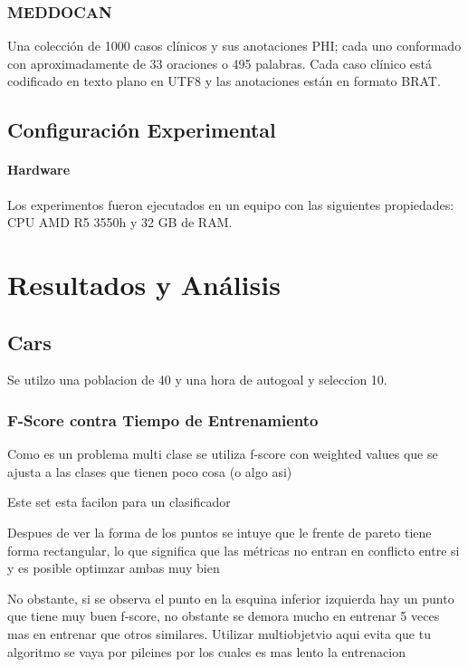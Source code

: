 \subsubsection{MEDDOCAN}

Una colecci\'on de 1000 casos cl\'inicos y sus anotaciones PHI; cada uno conformado con aproximadamente de 33 oraciones o 495 palabras. Cada caso cl\'inico est\'a codificado en texto plano en UTF8 y las anotaciones est\'an en formato BRAT.


\subsection{Configuraci\'on Experimental}

\paragraph{Hardware} Los experimentos fueron ejecutados en un equipo con las siguientes propiedades: CPU AMD R5 3550h y 32 GB de RAM.

\section{Resultados y An\'alisis}

\subsection{Cars}

Se utilzo una poblacion de 40 y una hora de autogoal y seleccion 10.

\subsubsection{F-Score contra Tiempo de Entrenamiento}

Como es un problema multi clase se utiliza f-score con weighted values que se ajusta a las clases que tienen poco cosa (o algo asi)

Este set esta facilon para un clasificador 

Despues de ver la forma de los puntos se intuye que le frente de pareto tiene forma rectangular, lo que significa que las m\'etricas no entran en conflicto entre si y es posible optimzar ambas muy bien

No obstante, si se observa el punto en la esquina inferior izquierda hay un punto que tiene muy buen f-score, no obstante se demora mucho en entrenar 5 veces mas en entrenar que otros similares. Utilizar multiobjetvio aqui evita que tu algoritmo se vaya  por pileines por los cuales es mas lento la entrenacion

